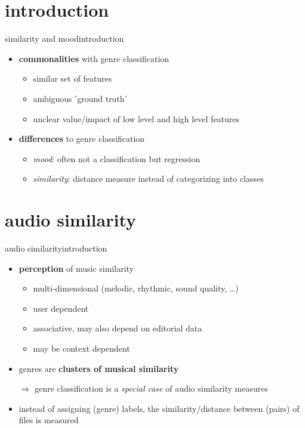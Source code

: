     \section[intro]{introduction}
        \begin{frame}{similarity and mood}{introduction}
            \begin{itemize}
                \item	\textbf{commonalities} with genre classification
                    \begin{itemize}
                        \item	similar set of features
                        \item	ambiguous 'ground truth'
                        \item   unclear value/impact of low level and high level features
                    \end{itemize}
                \bigskip
                \item<2->	 \textbf{differences} to genre classification
                    \begin{itemize}
                        \item	\textit{mood}: often not a classification but regression
                        \item	\textit{similarity}: distance measure instead of categorizing into classes
                    \end{itemize}
            \end{itemize}
        \end{frame}


    \section[similarity]{audio similarity}
        \begin{frame}{audio similarity}{introduction}
            \begin{itemize}
                \item   \textbf{perception} of music similarity
                    \begin{itemize}
                        \item	multi-dimensional (melodic, rhythmic, sound quality, \ldots)
                        \item	user dependent
                        \item	associative, may also depend on editorial data
                        \item	may be context dependent
                    \end{itemize}
                \bigskip
                \item<2->   genres are \textbf{clusters of musical similarity}
                \item[$\Rightarrow$]	genre classification is a \textit{special case} of audio similarity measures
                \item<3->	instead of assigning (genre) labels, the similarity/distance between (pairs) of files is measured
            \end{itemize}
        \end{frame}

